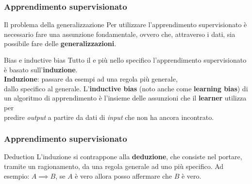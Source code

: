 \begin{frame}

	\frametitle{Apprendimento supervisionato}

	\begin{block}{Il problema della generalizzazione}
		Per utilizzare l'apprendimento supervisionato è necessario fare una assunzione fondamentale, ovvero che, attraverso i dati, sia possibile fare delle \textbf{generalizzazioni}.\\
	\end{block}

	\pause

	\begin{block}{Bias e inductive bias}
		Tutto il \ml e più nello specifico l'apprendimento supervisionato è basato sull'\textbf{induzione}.\\
		\textbf{Induzione}: passare da esempi ad una regola più generale,\\
		\hspace{31mm} dallo specifico al generale.
		\newlinedouble
		L'\textbf{inductive bias} (noto anche come \textbf{learning bias}) di un algoritmo di apprendimento è l'insieme delle assunzioni che il \textbf{learner} utilizza per\\ predire \textit{output} a partire da dati di \textit{input} che non ha ancora incontrato.
	\end{block}



\end{frame}




\begin{frame}

	\frametitle{Apprendimento supervisionato}

	\begin{block}{Deduction}
		L'induzione si contrappone alla \textbf{deduzione}, che consiste nel portare, tramite un ragionamento,
		da una regola generale ad uno più specifico.
		\newlinedouble
		Ad esempio: $A \implies B$, se $A$ è vero allora posso affermare che $B$ è vero.

	\end{block}


\end{frame}



